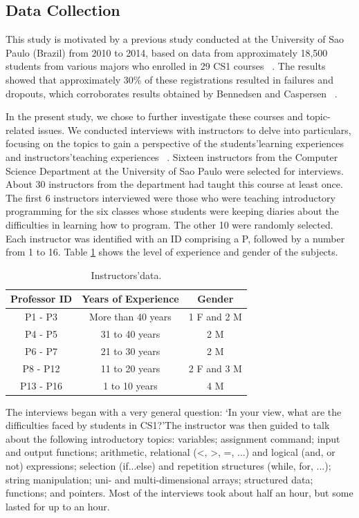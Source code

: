 \documentclass[sigconf]{acmart}
\begin{document}
\subsection{Data Collection}
This study is motivated by a previous study conducted at the University of Sao Paulo (Brazil) from 2010 to 2014, based on data from approximately 18,500 students from various majors who enrolled in 29 CS1 courses ~\cite{Bosse16}. The results showed that approximately 30\% of these registrations resulted in failures and dropouts, which corroborates results obtained by Bennedsen and Caspersen ~\cite{Bennedsen07}. 

In the present study, we chose to further investigate these courses and topic-related issues. We conducted interviews with instructors to delve into particulars, focusing on the topics to gain a perspective of the students\textquoteright \space learning experiences and instructors\textquoteright \space teaching experiences ~\cite{Creswell14}. Sixteen instructors from the Computer Science Department at the University of Sao Paulo were selected for interviews. About 30 instructors from the department had taught this course at least once. The first 6 instructors interviewed were those who were teaching introductory programming for the six classes whose students were keeping diaries about the difficulties in learning how to program. The other 10 were randomly selected. Each instructor was identified with an ID comprising a P, followed by a number from 1 to 16. Table \ref{tab:instructors} shows the level of experience and gender of the subjects.

\begin{table}
  \caption{Instructors\textquoteright \space data.}
  \label{tab:instructors}
  \begin{tabular}{ccc}
    \toprule
    Professor ID&Years of Experience&Gender\\
    \midrule
    P1 - P3 & More than 40 years & 1 F and 2 M \\
    P4 - P5 & 31 to 40 years & 2 M \\
    P6 - P7 & 21 to 30 years & 2 M \\
    P8 - P12 & 11 to 20 years & 2 F and 3 M \\
    P13 - P16 & 1 to 10 years & 4 M \\
  \bottomrule
\end{tabular}
\end{table}

The interviews began with a very general question: \textquoteleft In your view, what are the difficulties faced by students in CS1?\textquoteright \space The instructor was then guided to talk about the following introductory topics: variables; assignment command; input and output functions; arithmetic, relational (\textless, \textgreater, =, ...) and logical (and, or not) expressions; selection (if...else) and repetition structures (while, for, ...); string manipulation; uni- and multi-dimensional arrays; structured data; functions; and pointers. Most of the interviews took about half an hour, but some lasted for up to an hour.
\end{document}
